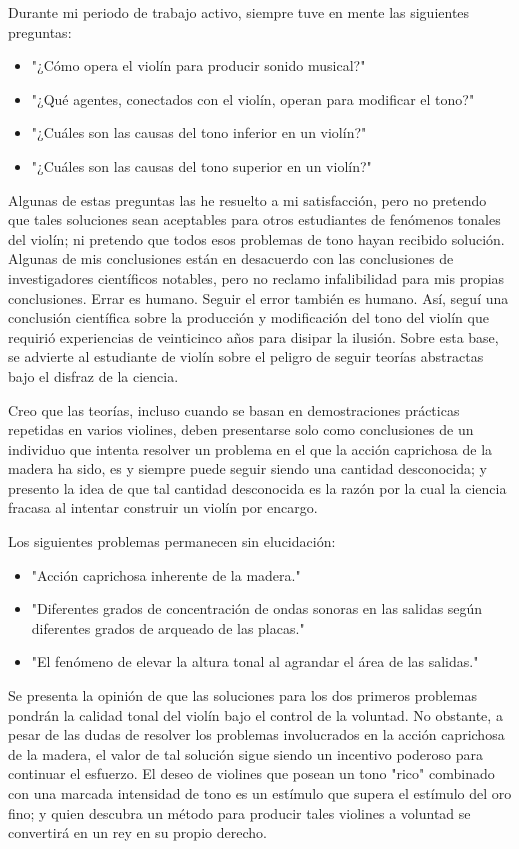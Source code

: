 \documentclass[12pt]{book}
\begin{document}
Durante mi periodo de trabajo activo, siempre tuve en mente las siguientes preguntas:
\begin{itemize}
    \item "¿Cómo opera el violín para producir sonido musical?"
    \item "¿Qué agentes, conectados con el violín, operan para modificar el tono?"
    \item "¿Cuáles son las causas del tono inferior en un violín?"
    \item "¿Cuáles son las causas del tono superior en un violín?"
\end{itemize}

Algunas de estas preguntas las he resuelto a mi satisfacción, pero no pretendo que tales soluciones sean aceptables para otros estudiantes de fenómenos tonales del violín; ni pretendo que todos esos problemas de tono hayan recibido solución. Algunas de mis conclusiones están en desacuerdo con las conclusiones de investigadores científicos notables, pero no reclamo infalibilidad para mis propias conclusiones. Errar es humano. Seguir el error también es humano. Así, seguí una conclusión científica sobre la producción y modificación del tono del violín que requirió experiencias de veinticinco años para disipar la ilusión. Sobre esta base, se advierte al estudiante de violín sobre el peligro de seguir teorías abstractas bajo el disfraz de la ciencia.

Creo que las teorías, incluso cuando se basan en demostraciones prácticas repetidas en varios violines, deben presentarse solo como conclusiones de un individuo que intenta resolver un problema en el que la acción caprichosa de la madera ha sido, es y siempre puede seguir siendo una cantidad desconocida; y presento la idea de que tal cantidad desconocida es la razón por la cual la ciencia fracasa al intentar construir un violín por encargo.

Los siguientes problemas permanecen sin elucidación:
\begin{itemize}
    \item "Acción caprichosa inherente de la madera."
    \item "Diferentes grados de concentración de ondas sonoras en las salidas según diferentes grados de arqueado de las placas."
    \item "El fenómeno de elevar la altura tonal al agrandar el área de las salidas."
\end{itemize}

Se presenta la opinión de que las soluciones para los dos primeros problemas pondrán la calidad tonal del violín bajo el control de la voluntad. No obstante, a pesar de las dudas de resolver los problemas involucrados en la acción caprichosa de la madera, el valor de tal solución sigue siendo un incentivo poderoso para continuar el esfuerzo. El deseo de violines que posean un tono "rico" combinado con una marcada intensidad de tono es un estímulo que supera el estímulo del oro fino; y quien descubra un método para producir tales violines a voluntad se convertirá en un rey en su propio derecho.
\end{document}
